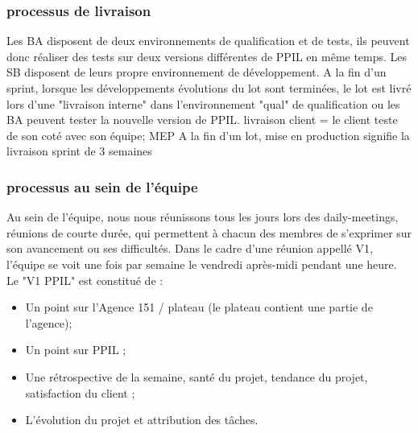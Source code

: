 \subsubsection{processus de livraison}
Les BA disposent de deux environnements de qualification et de tests, ils peuvent donc réaliser des tests sur deux versions différentes de PPIL en même temps. Les SB disposent de leurs propre environnement de développement.
A la fin d'un sprint, lorsque les développements évolutions du lot sont terminées, le lot est livré lors d'une "livraison interne" dans l'environnement "qual" de qualification ou les BA peuvent tester la nouvelle version de PPIL.
livraison client = le client teste de son coté avec son équipe;
MEP A la fin d'un lot, mise en production signifie la livraison
sprint de 3 semaines
\subsubsection{processus au sein de l'équipe}
Au sein de l'équipe, nous nous réunissons tous les jours lors des daily-meetings, réunions de courte durée, qui permettent à chacun des membres de s'exprimer sur son avancement ou ses difficultés. Dans le cadre d'une réunion appellé V1, l'équipe se voit une fois par semaine le vendredi après-midi pendant une heure. 
Le "V1 PPIL" est constitué de :
\begin{itemize}
    \item Un point sur l'Agence 151 / plateau (le plateau contient une partie de l'agence);
    \item Un point sur PPIL ; 
    \item Une rétrospective de la semaine, santé du projet, tendance du projet, satisfaction du client ;
    \item L'évolution du projet et attribution des tâches.
\end{itemize}
